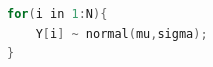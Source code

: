 \begin{lstlisting}[language=C++,label={stan::26_01},caption={sampling記法}]
for(i in 1:N){
    Y[i] ~ normal(mu,sigma);
}
\end{lstlisting}
